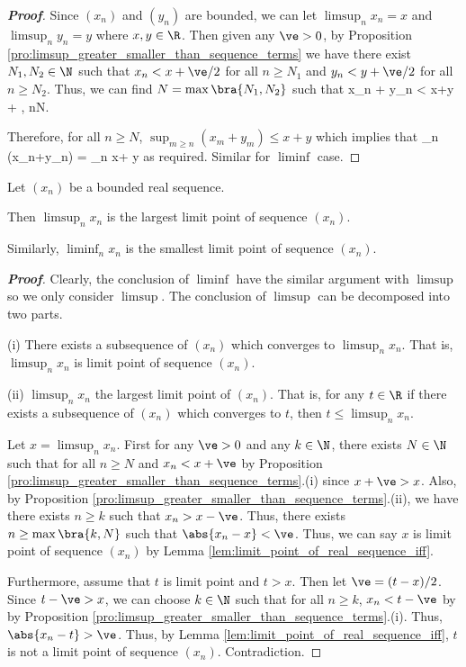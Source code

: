 \begin{proof}[\bf Proof]
Since $(x_n)$ and $(y_n)$ are bounded, we can let $\limsup_n x_n = x$ and $\limsup_n y_n = y$ where $x,y\in \R$. Then given any $\ve>0$, by Proposition \ref{pro:limsup_greater_smaller_than_sequence_terms} we have there exist $N_1,N_2\in \N$ such that $x_n < x + \ve/2$ for all $n\geq N_1$ and $y_n < y + \ve/2$ for all $n\geq N_2$. Thus, we can find $N = \max\bra{N_1,N_2}$ such that
\be
x_n + y_n < x+y + \ve, \quad \forall n\geq N.
\ee

Therefore, for all $n\geq N$, $\sup_{m\geq n} (x_m+ y_m) \leq x+y$ which implies that
\be
\limsup_n (x_n+y_n) = \inf_n  \leq x+ y
\ee
as required. Similar for $\liminf$ case.
\end{proof}



\begin{theorem}\label{thm:limsup_largest_limit_point_bounded_real_sequence}
Let $(x_n)$ be a bounded real sequence.

Then $\limsup_n x_n$ is the largest limit point of sequence $(x_n)$.

Similarly, $\liminf_n x_n$ is the smallest limit point of sequence $(x_n)$.
\end{theorem}

\begin{proof}[\bf Proof]
Clearly, the conclusion of $\liminf$ have the similar argument with $\limsup$ so we only consider $\limsup$. The conclusion of $\limsup$ can be decomposed into two parts.
\ben
\item [(i)] There exists a subsequence of $(x_n)$ which converges to $\limsup_n x_n$. That is, $\limsup_n x_n$ is limit point of sequence $(x_n)$.
\item [(ii)] $\limsup_n x_n$ the largest limit point of $(x_n)$. That is, for any $t\in \R$ if there exists a subsequence of $(x_n)$ which converges to $t$, then $t\leq \limsup_n x_n$.
\een

Let $x = \limsup_n x_n$. First for any $\ve>0$ and any $k\in \N$, there exists $N\in \N$ such that for all $n\geq N$ and $x_n < x + \ve$ by Proposition \ref{pro:limsup_greater_smaller_than_sequence_terms}.(i) since $x+\ve > x$. Also, by Proposition \ref{pro:limsup_greater_smaller_than_sequence_terms}.(ii), we have there exists $n\geq k$ such that $x_n > x-\ve$. Thus, there exists $n\geq \max\bra{k,N}$ such that $\abs{x_n-x} < \ve$. Thus, we can say $x$ is limit point of sequence $(x_n)$ by Lemma \ref{lem:limit_point_of_real_sequence_iff}.

Furthermore, assume that $t$ is limit point and $t>x$. Then let $\ve = (t-x)/2$. Since $t-\ve > x$, we can choose $k\in \N$ such that for all $n\geq k$, $x_n < t-\ve$ by by Proposition \ref{pro:limsup_greater_smaller_than_sequence_terms}.(i). Thus, $\abs{x_n - t} > \ve$. Thus, by Lemma \ref{lem:limit_point_of_real_sequence_iff}, $t$ is not a limit point of sequence $(x_n)$. Contradiction.
\end{proof}


